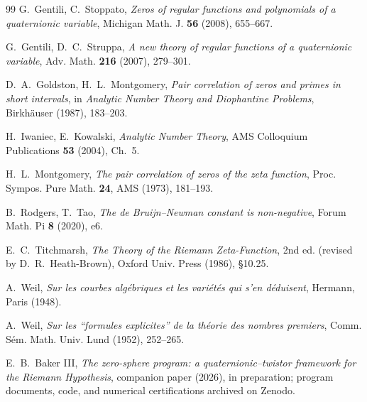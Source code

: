 \documentclass[11pt]{amsart}
\theoremstyle{definition}
\theoremstyle{remark}
\begin{document}
\begin{thebibliography}{99}
 G.~Gentili, C.~Stoppato, \emph{Zeros of regular functions and polynomials of a quaternionic variable}, Michigan Math. J. \textbf{56} (2008), 655--667.

 G.~Gentili, D.~C.~Struppa, \emph{A new theory of regular functions of a quaternionic variable}, Adv. Math. \textbf{216} (2007), 279--301.

 D.~A.~Goldston, H.~L.~Montgomery, \emph{Pair correlation of zeros and primes in short intervals}, in \emph{Analytic Number Theory and Diophantine Problems}, Birkh\"auser (1987), 183--203.

 H.~Iwaniec, E.~Kowalski, \emph{Analytic Number Theory}, AMS Colloquium Publications \textbf{53} (2004), Ch.~5.

 H.~L.~Montgomery, \emph{The pair correlation of zeros of the zeta function}, Proc. Sympos. Pure Math. \textbf{24}, AMS (1973), 181--193.

 B.~Rodgers, T.~Tao, \emph{The de Bruijn--Newman constant is non-negative}, Forum Math. Pi \textbf{8} (2020), e6.

 E.~C.~Titchmarsh, \emph{The Theory of the Riemann Zeta-Function}, 2nd ed. (revised by D.~R.~Heath-Brown), Oxford Univ. Press (1986), \S10.25.

 A.~Weil, \emph{Sur les courbes alg\'ebriques et les vari\'et\'es qui s'en d\'eduisent}, Hermann, Paris (1948).

 A.~Weil, \emph{Sur les ``formules explicites'' de la th\'eorie des nombres premiers}, Comm. S\'em. Math. Univ. Lund (1952), 252--265.

 E.~B.~Baker III, \emph{The zero-sphere program: a quaternionic--twistor framework for the Riemann Hypothesis}, companion paper (2026), in preparation; program documents, code, and numerical certifications archived on Zenodo.

\end{thebibliography}
\end{document}
